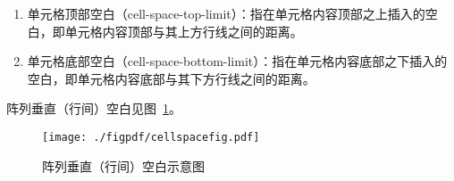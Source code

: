 \documentclass[dvipsnames]{article}%
\begin{document}
\begin{enumerate}
\begin{enumerate}
\begin{enumerate}
    \begin{enumerate}
    \item 单元格顶部空白（cell-space-top-limit）：指在单元格内容顶部之上插入的空白，即单元格内容顶部与其上方行线之间的距离。
    \item 单元格底部空白（cell-space-bottom-limit）：指在单元格内容底部之下插入的空白，即单元格内容底部与其下方行线之间的距离。
    \end{enumerate}
  阵列垂直（行间）空白见图~\ref{fig:阵列垂直（行间）空白示意图}。
  \end{enumerate}

\begin{figure}[htbp]
  \centering
  \texttt{[image: ./figpdf/cellspacefig.pdf]}
  \caption{阵列垂直（行间）空白示意图}
  \label{fig:阵列垂直（行间）空白示意图}
\end{figure}


\end{enumerate}
\end{enumerate}
\end{document}
